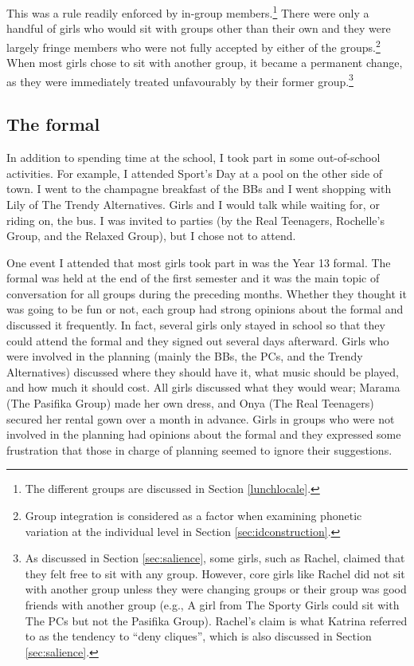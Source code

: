 This was a rule readily enforced by in-group members.\footnote{The different groups are discussed in Section \ref{lunchlocale}.}  There were only a handful of girls who would sit with groups other than their own and they were largely fringe members who were not fully accepted by either of the groups.\footnote{Group integration is considered as a factor when examining phonetic variation at the individual level in Section \ref{sec:idconstruction}.}  When most girls chose to sit with another group, it became a permanent change, as they were immediately treated unfavourably by their former group.\footnote{As discussed in Section \ref{sec:salience}, some girls, such as Rachel, claimed that they felt free to sit with any group.  However, core girls like Rachel did not sit with another group unless they were changing groups or their group was good friends with another group (e.g., A girl from The Sporty Girls could sit with The PCs but not the Pasifika Group).  Rachel's claim is what Katrina referred to as the tendency to ``deny cliques'', which is also discussed in Section \ref{sec:salience}.}  



\subsection{The formal}

In addition to spending time at the school, I took part in some out-of-school activities.  For example, I attended Sport's Day at a pool on the other side of town.  I went to the champagne breakfast of the BBs and I went shopping with Lily of The Trendy Alternatives.  Girls and I would talk while waiting for, or riding on, the bus.  I was invited to parties (by the Real Teenagers, Rochelle's Group, and the Relaxed Group), but I chose not to attend.  

One event I attended that most girls took part in was the Year 13 formal.  The formal was held at the end of the first semester and it was the main topic of conversation for all groups during the preceding months.  Whether they thought it was going to be fun or not, each group had strong opinions about the formal and discussed it frequently.  In fact, several girls only stayed in school so that they could attend the formal and they signed out several days afterward.  Girls who were involved in the planning (mainly the BBs, the PCs, and the Trendy Alternatives) discussed where they should have it, what music should be played, and how much it should cost.  All girls discussed what they would wear; Marama (The Pasifika Group) made her own dress, and Onya (The Real Teenagers) secured her rental gown over a month in advance.  Girls in groups who were not involved in the planning had opinions about the formal and they expressed some frustration that those in charge of planning seemed to ignore their suggestions.

